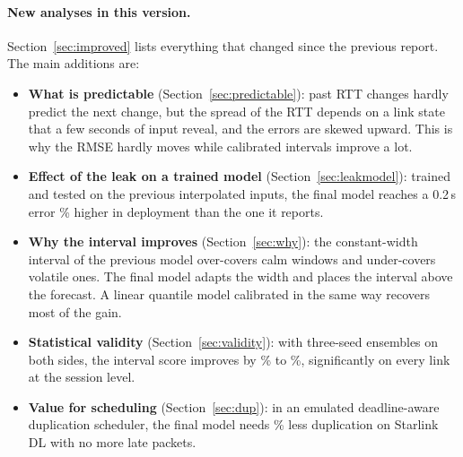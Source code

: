 \paragraph{New analyses in this version.} Section~\ref{sec:improved} lists everything that changed since the previous report. The main additions are:
\begin{itemize}[leftmargin=*]
  \item \textbf{What is predictable} (Section~\ref{sec:predictable}): past RTT changes hardly predict the next change, but the spread of the RTT depends on a link state that a few seconds of input reveal, and the errors are skewed upward. This is why the RMSE hardly moves while calibrated intervals improve a lot.
  \item \textbf{Effect of the leak on a trained model} (Section~\ref{sec:leakmodel}): trained and tested on the previous interpolated inputs, the final model reaches a 0.2\,s error \LeakOptDSMAEhOne\% higher in deployment than the one it reports.
  \item \textbf{Why the interval improves} (Section~\ref{sec:why}): the constant-width interval of the previous model over-covers calm windows and under-covers volatile ones. The final model adapts the width and places the interval above the forecast. A linear quantile model calibrated in the same way recovers most of the gain.
  \item \textbf{Statistical validity} (Section~\ref{sec:validity}): with three-seed ensembles on both sides, the interval score improves by \BSISWorstAbs\% to \BSISBestAbs\%, significantly on every link at the session level.
  \item \textbf{Value for scheduling} (Section~\ref{sec:dup}): in an emulated deadline-aware duplication scheduler, the final model needs \SchedSaveSLDL\% less duplication on Starlink DL with no more late packets.
\end{itemize}
